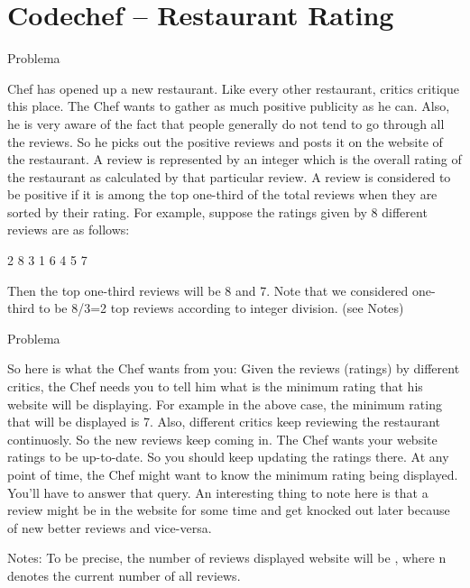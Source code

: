 \section{Codechef -- Restaurant Rating}

\begin{frame}[fragile]{Problema}

Chef has opened up a new restaurant. Like every other restaurant, critics critique this place. The Chef wants to gather as much positive publicity as he can. Also, he is very aware of the fact that people generally do not tend to go through all the reviews. So he picks out the positive reviews and posts it on the website of the restaurant. A review is represented by an integer which is the overall rating of the restaurant as calculated by that particular review. A review is considered to be positive if it is among the top one-third of the total reviews when they are sorted by their rating. For example, suppose the ratings given by 8 different reviews are as follows:

2 8 3 1 6 4 5 7

Then the top one-third reviews will be 8 and 7. Note that we considered one-third to be 8/3=2 top reviews according to integer division. (see Notes)

\end{frame}

\begin{frame}[fragile]{Problema}

So here is what the Chef wants from you: Given the reviews (ratings) by different critics, the Chef needs you to tell him what is the minimum rating that his website will be displaying. For example in the above case, the minimum rating that will be displayed is 7. Also, different critics keep reviewing the restaurant continuosly. So the new reviews keep coming in. The Chef wants your website ratings to be up-to-date. So you should keep updating the ratings there. At any point of time, the Chef might want to know the minimum rating being displayed. You'll have to answer that query. An interesting thing to note here is that a review might be in the website for some time and get knocked out later because of new better reviews and vice-versa.

Notes: To be precise, the number of reviews displayed website will be , where n denotes the current number of all reviews.

\end{frame}

